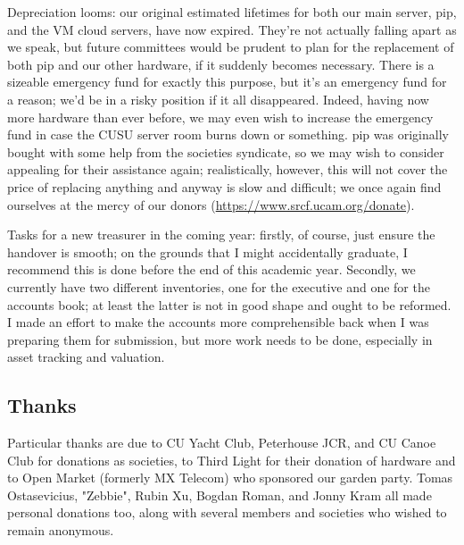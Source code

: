 Depreciation looms: our original estimated lifetimes for both our main
server, pip, and the VM cloud servers, have now expired. They're not
actually falling apart as we speak, but future committees would be
prudent to plan for the replacement of both pip and our other hardware,
if it suddenly becomes necessary. There is a sizeable emergency fund for
exactly this purpose, but it's an emergency fund for a reason; we'd be
in a risky position if it all disappeared. Indeed, having now more
hardware than ever before, we may even wish to increase the emergency
fund in case the CUSU server room burns down or something. pip was
originally bought with some help from the societies syndicate, so we may
wish to consider appealing for their assistance again; realistically,
however, this will not cover the price of replacing anything and anyway
is slow and difficult; we once again find ourselves at the mercy of our
donors (\url{https://www.srcf.ucam.org/donate}).

Tasks for a new treasurer in the coming year: firstly, of course, just
ensure the handover is smooth; on the grounds that I might accidentally
graduate, I recommend this is done before the end of this academic year.
Secondly, we currently have two different inventories, one for the
executive and one for the accounts book; at least the latter is not in
good shape and ought to be reformed. I made an effort to make the
accounts more comprehensible back when I was preparing them for
submission, but more work needs to be done, especially in asset tracking
and valuation.

\subsection{Thanks}

Particular thanks are due to CU Yacht Club, Peterhouse JCR, and CU Canoe
Club for donations as societies, to Third Light for their donation of
hardware and to Open Market (formerly MX Telecom) who sponsored our
garden party. Tomas Ostasevicius, "Zebbie", Rubin Xu, Bogdan Roman, and
Jonny Kram all made personal donations too, along with several members
and societies who wished to remain anonymous.
